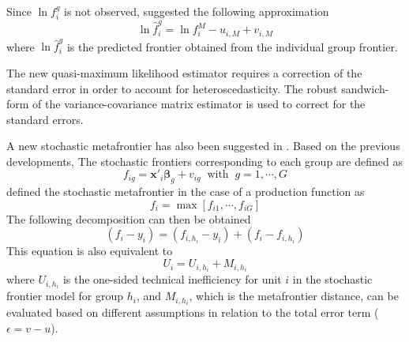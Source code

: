 \documentclass[nojss]{jss}
\begin{document}
 Since $\ln f_i^g$ is not observed, \citet{huang14} suggested the 
 following approximation
 \begin{equation}\label{eq:3.2.6}
 \ln \hat{f}_i^g = \ln f_i^M - u_{i,M} + v_{i,M}
 \end{equation}
 where $\ln \hat{f}_i^g$ is the predicted frontier obtained from the 
 individual group frontier.
 
 The new quasi-maximum likelihood estimator requires a correction of the 
 standard error in order to account for heteroscedasticity. The robust
 sandwich-form of the variance-covariance matrix estimator is used to 
 correct for the standard errors.

 A new stochastic metafrontier has also been suggested in 
 \citet{am17}. Based on the previous developments, The stochastic 
 frontiers corresponding to each group are defined as
 \begin{equation}\label{eq:3.2.7}
 f_{ig} = \mathbf{x}'_i\bm{\beta}_g + v_{ig} \;\; \text{with} 
 \;\; g= 1, \cdots, G
 \end{equation}
 \citet{am17} defined the stochastic metafrontier in the case of a 
 production function as 
 \begin{equation}\label{eq:3.2.8}
 f_i = \max\left[f_{i1}, \cdots, f_{iG}\right]
 \end{equation}
 The following decomposition can then be obtained 
 \begin{equation}\label{eq:3.2.9}
 \left(f_i - y_i\right)=\left(f_{i,h_i} - y_i\right) + 
 \left(f_i - f_{i,h_i}\right)
 \end{equation}
 This equation is also equivalent to
  \begin{equation}\label{eq:3.2.10}
 U_i=U_{i, h_i} + M_{i, h_i}
 \end{equation}
 where $U_{i, h_i}$ is the one-sided technical inefficiency for unit 
 $i$ in the stochastic frontier model for group $h_i$, and 
 $M_{i, h_i}$, which is the metafrontier distance, can be evaluated
 based on different assumptions in relation to the total error term 
 ($\epsilon = v-u$).
 
\end{document}
